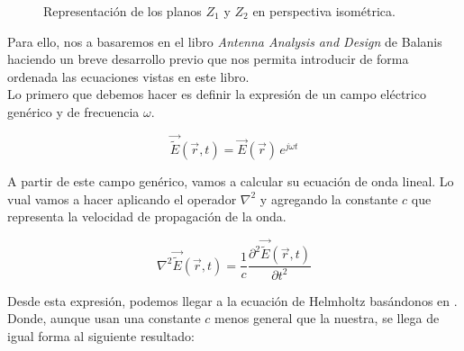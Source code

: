 \documentclass{article}
\begin{document}
\begin{figure}[htbp]
  \centering
  \caption{Representación de los planos \( Z_1 \) y \( Z_2 \) en perspectiva isométrica.}
  \label{fig:planos_NF_Z1_Z2}
\end{figure}

Para ello, nos a basaremos en el libro \textit{Antenna Analysis and Design} de Balanis \autocite{Balanis_2016} haciendo un breve desarrollo previo que nos permita introducir de forma ordenada las ecuaciones vistas en este libro.
\\

Lo primero que debemos hacer es definir la expresión de un campo eléctrico genérico y de frecuencia $\omega$.

\begin{equation}
\vec{\tilde{E}}(\vec{r},t)=\vec{E}(\vec{r})\,e^{j\omega t}
\label{NFtoNF: eq-Campo E generico}
\end{equation}

A partir de este campo genérico, vamos a calcular su ecuación de onda lineal. Lo vual vamos a hacer aplicando el operador $\nabla^{2}$ y agregando la constante $c$ que representa la velocidad de propagación de la onda.

\begin{equation}
\nabla^{2} \vec{\tilde{E}}(\vec{r},t)=\frac{1}{c}\frac{\partial^{2}
\vec{\tilde{E}}(\vec{r},t)}{\partial t^{2}}
\label{NFtoNF: eq-de-onde-campo-electrico}
\end{equation}

Desde esta expresión, podemos llegar a la ecuación de Helmholtz basándonos en \autocite{Pozar}. Donde, aunque usan una constante $c$ menos general que la nuestra, se llega de igual forma al siguiente resultado:
\end{document}
